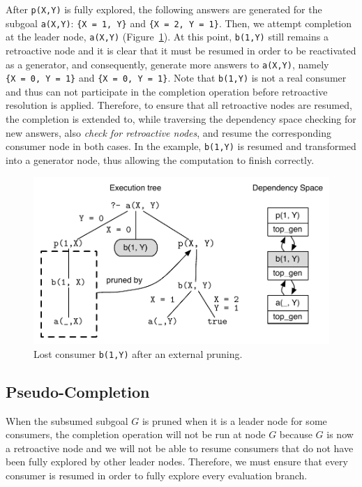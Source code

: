 After \texttt{p(X,Y)} is fully explored, the following answers are generated for the subgoal \texttt{a(X,Y)}:
\texttt{\{X~=~1,~Y\}} and \texttt{\{X~=~2,~Y~=~1\}}. Then, we attempt completion at the leader node,
\texttt{a(X,Y)} (Figure~\ref{fig:retro_lost_consumer}). At this point, \texttt{b(1,Y)} still remains
a retroactive node and it is clear that it must be resumed in order to be reactivated as a generator,
and consequently, generate more answers to \texttt{a(X,Y)}, namely \texttt{\{X~=~0,~Y~=~1\}} and
\texttt{\{X~=~0,~Y~=~1\}}. Note that \texttt{b(1,Y)} is not a real consumer and thus can not participate
in the completion operation before retroactive resolution is applied. Therefore, to ensure that all
retroactive nodes are resumed, the completion is extended to, while traversing the dependency space
checking for new answers, also \textit{check for retroactive nodes}, and resume the corresponding
consumer node in both cases. In the example, \texttt{b(1,Y)} is resumed and transformed into a
generator node, thus allowing the computation to finish correctly.

\begin{figure}[ht]
  \centering
    \includegraphics[scale=0.6]{retro_lost_consumer.pdf}
  \caption{Lost consumer \texttt{b(1,Y)} after an external pruning.}
  \label{fig:retro_lost_consumer}
\end{figure}

\subsection{Pseudo-Completion}

When the subsumed subgoal $G$ is pruned when it is a leader node for some consumers, the completion operation
will not be run at node $G$ because $G$ is now a retroactive node and we will not be able to resume
consumers that do not have been fully explored by other leader nodes. Therefore, we must ensure
that every consumer is resumed in order to fully explore every evaluation branch.

